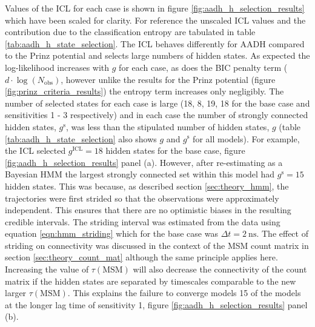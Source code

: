 Values of the ICL for each case is shown in figure \ref{fig:aadh_h_selection_results} which have been scaled for clarity. For reference the unscaled ICL values and the contribution due to the classification entropy are tabulated in table \ref{tab:aadh_h_state_selection}. The ICL behaves differently for AADH compared to the Prinz potential and selects large numbers of hidden states. As expected the log-likelihood increases with $g$ for each case, as does the BIC penalty term ($d\cdot\log{\left(N_{\mathrm{obs}}\right)}$, however unlike the results for the Prinz potential (figure \ref{fig:prinz_criteria_results}) the entropy term increases only negligibly. The number of selected states for each case is large (18, 8, 19, 18 for the base case and sensitivities 1 - 3 respectively) and in each case the number of strongly connected hidden states, $g^{\mathrm{s}}$, was less than the stipulated number of hidden states, $g$ (table \ref{tab:aadh_h_state_selection} also shows $g$ and $g^{\mathrm{s}}$ for all models). For example, the ICL selected $g^{\mathrm{ICL}}=18$ hidden states for the base case, figure \ref{fig:aadh_h_selection_results} panel (a). However, after re-estimating as a Bayesian HMM the largest strongly connected set within this model had  $g^{\mathrm{s}}=15$ hidden states. This was because, as described section \ref{sec:theory_hmm}, the trajectories were first strided so that the observations were approximately independent. This ensures that there are no optimistic biases in the resulting credible intervals. The striding interval was estimated from the data using  equation \ref{eqn:hmm_striding} which for the base case was $\Delta t = \SI{2}{\nano\second}$.  The effect of striding on connectivity was discussed in the context of the MSM count matrix in section \ref{sec:theory_count_mat} although the same principle applies here. Increasing the value of $\tau(\mathrm{MSM})$ will also decrease the connectivity of the count matrix if the hidden states are separated by timescales comparable to the new larger $\tau(\mathrm{MSM})$. This explains the failure to converge models 15 of the models at the longer lag time of sensitivity 1, figure \ref{fig:aadh_h_selection_results} panel (b).   


